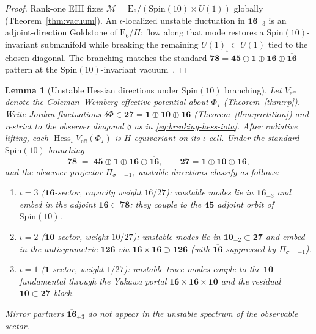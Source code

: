 \documentclass[11pt]{article}
\theoremstyle{plain}
\newtheorem{lemma}[theorem]{Lemma}
\theoremstyle{definition}
\theoremstyle{remark}
\numberwithin{equation}{section}
\newcommand{\E}[1]{\mathrm{E}_{#1}}
\newcommand{\Spin}{\mathrm{Spin}}
\newcommand{\orderparam}{\Phi}
\newcommand{\Hess}{\operatorname{Hess}}
\begin{document}
\begin{proof}
Rank-one EIII fixes $\mathcal{M}=\E{6}/(\Spin(10)\times U(1))$ globally
(Theorem~\ref{thm:vacuum}). An $\iota$-localized unstable fluctuation in
$\mathbf{16}_{-3}$ is an adjoint-direction Goldstone of $\E{6}/H$; flow along
that mode restores a $\Spin(10)$-invariant submanifold while breaking the
remaining $U(1)_\iota\subset U(1)$ tied to the chosen diagonal. The branching
matches the standard
$\mathbf{78}=\mathbf{45}\oplus\mathbf{1}\oplus\mathbf{16}\oplus\overline{\mathbf{16}}$
pattern at the $\Spin(10)$-invariant vacuum~\cite{Witten1985,GeorgiGlashow1974}.
\end{proof}

\begin{lemma}[Unstable Hessian directions under $\Spin(10)$ branching]
\label{lem:breaking-hess-spin10}
Let $V_{\mathrm{eff}}$ denote the Coleman--Weinberg effective potential about
$\orderparam_\star$ (Theorem~\ref{thm:rp}). Write Jordan fluctuations
$\delta\orderparam\in\mathbf{27}=\mathbf{1}\oplus\mathbf{10}\oplus\mathbf{16}$
(Theorem~\ref{thm:partition}) and restrict to the observer diagonal
$\mathfrak{d}$ as in \eqref{eq:breaking-hess-iota}. After radiative lifting,
each $\Hess_\iota V_{\mathrm{eff}}(\orderparam_\star)$ is
$H$-equivariant on its $\iota$-cell. Under the standard $\Spin(10)$ branching
\begin{equation}\label{eq:breaking-adjoint-branch}
  \mathbf{78}
  \;=\;
  \mathbf{45}\oplus\mathbf{1}\oplus\mathbf{16}\oplus\overline{\mathbf{16}},
  \qquad
  \mathbf{27}=\mathbf{1}\oplus\mathbf{10}\oplus\mathbf{16},
\end{equation}
and the observer projector $\Pi_{\sigma=-1}$, unstable directions classify as
follows:
\begin{enumerate}[label=(\roman*),leftmargin=*]
  \item $\iota=3$ ($\mathbf{16}$-sector, capacity weight $16/27$): unstable
    modes lie in $\mathbf{16}_{-3}$ and embed in the adjoint
    $\mathbf{16}\subset\mathbf{78}$; they couple to the $\mathbf{45}$ adjoint
    orbit of $\Spin(10)$.
  \item $\iota=2$ ($\mathbf{10}$-sector, weight $10/27$): unstable modes lie in
    $\mathbf{10}_{-2}\subset\mathbf{27}$ and embed in the antisymmetric
    $\mathbf{126}$ via $\mathbf{16}\times\mathbf{16}\supset\mathbf{126}$
    (with $\overline{\mathbf{16}}$ suppressed by $\Pi_{\sigma=-1}$).
  \item $\iota=1$ ($\mathbf{1}$-sector, weight $1/27$): unstable trace modes
    couple to the $\mathbf{10}$ fundamental through the Yukawa portal
    $\mathbf{16}\times\mathbf{16}\times\mathbf{10}$ and the residual
    $\mathbf{10}\subset\mathbf{27}$ block.
\end{enumerate}
Mirror partners $\overline{\mathbf{16}}_{+3}$ do not appear in the unstable
spectrum of the observable sector.
\end{lemma}
\end{document}

